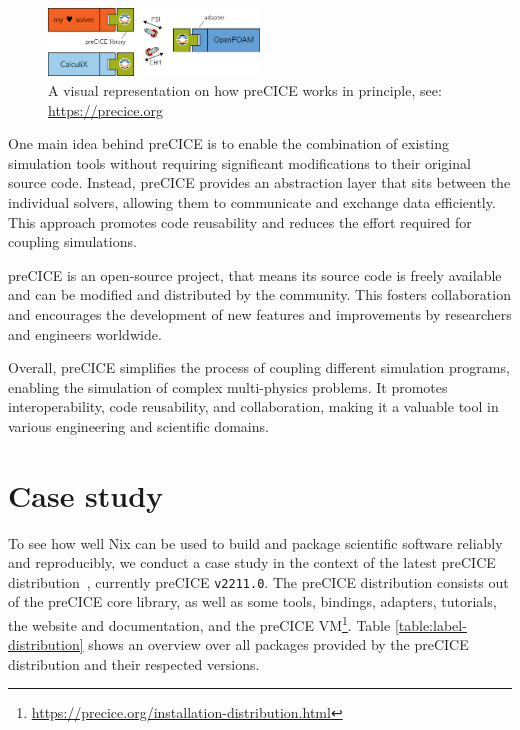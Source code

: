 \documentclass{eceasst}
\begin{document}
\begin{figure}
    \centering
    \includegraphics[width=0.5\textwidth]{figures/precice.png}
    \caption{A visual representation on how preCICE works in principle, see: \url{https://precice.org}}
    \label{fig:precice}
\end{figure}

One main idea behind preCICE is to enable the combination of existing simulation tools without requiring significant modifications to their original source code.
Instead, preCICE provides an abstraction layer that sits between the individual solvers, allowing them to communicate and exchange data efficiently.
This approach promotes code reusability and reduces the effort required for coupling simulations.

preCICE is an open-source project, that means its source code is freely available and can be modified and distributed by the community.
This fosters collaboration and encourages the development of new features and improvements by researchers and engineers worldwide.

Overall, preCICE simplifies the process of coupling different simulation programs, enabling the simulation of complex multi-physics problems.
It promotes interoperability, code reusability, and collaboration, making it a valuable tool in various engineering and scientific domains.

\section{Case study}

To see how well Nix can be used to build and package scientific software reliably and reproducibly, we conduct a case study in the context of the latest preCICE distribution~\cite{preciceDistribution}, currently preCICE \texttt{v2211.0}.
The preCICE distribution consists out of the preCICE core library, as well as some tools, bindings, adapters, tutorials, the website and documentation, and the preCICE VM\footnote{\url{https://precice.org/installation-distribution.html}}.
Table \ref{table:label-distribution} shows an overview over all packages provided by the preCICE distribution and their respected versions.
\end{document}
